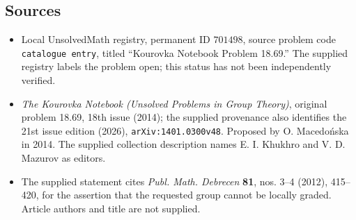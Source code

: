 \documentclass[11pt]{article}
\begin{document}
\subsection{Sources}
\begin{itemize}
\item Local UnsolvedMath registry, permanent ID \(701498\), source problem code \texttt{catalogue entry}, titled ``Kourovka Notebook Problem 18.69.'' The supplied registry labels the problem open; this status has not been independently verified.
\item \emph{The Kourovka Notebook (Unsolved Problems in Group Theory)}, original problem 18.69, 18th issue (2014); the supplied provenance also identifies the 21st issue edition (2026), \texttt{arXiv:1401.0300v48}. Proposed by O. Macedo\'nska in 2014. The supplied collection description names E. I. Khukhro and V. D. Mazurov as editors.
\item The supplied statement cites \emph{Publ. Math. Debrecen} \textbf{81}, nos. 3--4 (2012), 415--420, for the assertion that the requested group cannot be locally graded. Article authors and title are not supplied.
\end{itemize}
\end{document}

